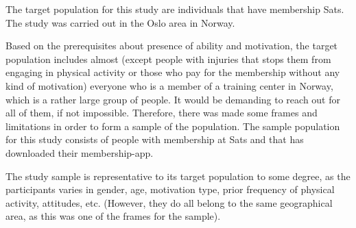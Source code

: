 The target population for this study are individuals that have membership Sats. The study was carried out in the Oslo area in Norway.  


Based on the prerequisites about presence of ability and motivation, the target population includes almost (except people with injuries that stops them from engaging in physical activity or those who pay for the membership without any kind of motivation) everyone who is a member of a training center in Norway, which is a rather large group of people. It would be demanding to reach out for all of them, if not impossible. Therefore, there was made some frames and limitations in order to form a sample of the population. The sample population for this study consists of people with membership at Sats and that has downloaded their membership-app. 
 
The study sample is representative to its target population to some degree, as the participants varies in gender, age, motivation type, prior frequency of physical activity, attitudes, etc. (However, they do all belong to the same geographical area, as this was one of the frames for the sample).




